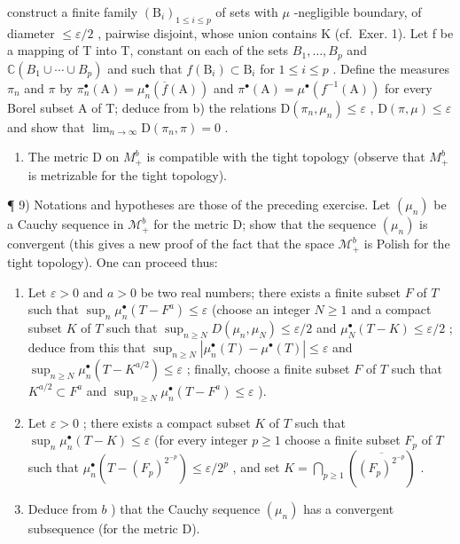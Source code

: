 construct a finite family \((\mathrm{B}_{i})_{1\leqslant i\leqslant p}\) of sets with \(\mu\) -negligible boundary, of diameter \(\leqslant\varepsilon/2\) , pairwise disjoint, whose union contains K (cf.~Exer. 1). Let f be a mapping of T into T, constant on each of the sets \(B_{1},\ldots,B_{p}\) and \(\mathbb{C}(B_{1}\cup\cdots\cup B_{p})\) and such that \(f(\mathrm{B}_i) \subset \mathrm{B}_i\) for \(1 \leqslant i \leqslant p\) . Define the measures \(\pi_n\) and \(\pi\) by \(\pi_n^\bullet(\mathrm{A}) = \mu_n^\bullet(\overline{f}(\mathrm{A}))\) and \(\pi^\bullet(\mathrm{A}) = \mu^\bullet(f^{-1}(\mathrm{A}))\) for every Borel subset A of T; deduce from b) the relations \(\mathrm{D}(\pi_n, \mu_n) \leqslant \varepsilon\) , \(\mathrm{D}(\pi, \mu) \leqslant \varepsilon\) and show that \(\lim_{n \to \infty} \mathrm{D}(\pi_n, \pi) = 0\) .

\begin{enumerate}
\def\labelenumi{\alph{enumi})}
\setcounter{enumi}{4}
\tightlist
\item
  The metric D on \(M_{+}^{b}\) is compatible with the tight topology (observe that \(M_{+}^{b}\) is metrizable for the tight topology).
\end{enumerate}

¶ 9) Notations and hypotheses are those of the preceding exercise. Let \((\mu_n)\) be a Cauchy sequence in \(\mathcal{M}_+^b\) for the metric D; show that the sequence \((\mu_n)\) is convergent (this gives a new proof of the fact that the space \(\mathcal{M}_+^b\) is Polish for the tight topology). One can proceed thus:

\begin{enumerate}
\def\labelenumi{\alph{enumi})}
\item
  Let \(\varepsilon > 0\) and \(a > 0\) be two real numbers; there exists a finite subset \(F\) of \(T\) such that \(\sup_{n} \mu_n^\bullet(T - F^a) \leqslant \varepsilon\) (choose an integer \(N \geqslant 1\) and a compact subset \(K\) of \(T\) such that \(\sup_{n \geqslant N} D(\mu_n, \mu_N) \leqslant \varepsilon/2\) and \(\mu_N^\bullet(T - K) \leqslant \varepsilon/2\) ; deduce from this that \(\sup_{n \geqslant N} |\mu_n^\bullet(T) - \mu^\bullet(T)| \leqslant \varepsilon\) and \(\sup_{n \geqslant N} \mu_n^\bullet(T - K^{a/2}) \leqslant \varepsilon\) ; finally, choose a finite subset \(F\) of \(T\) such that \(K^{a/2} \subset F^a\) and \(\sup_{n \geqslant N} \mu_n^\bullet(T - F^a) \leqslant \varepsilon\) ).
\item
  Let \(\varepsilon > 0\) ; there exists a compact subset \(K\) of \(T\) such that \(\sup_{n} \mu_n^\bullet(T - K) \leqslant \varepsilon\) (for every integer \(p \geqslant 1\) choose a finite subset \(F_p\) of \(T\) such that \(\mu_n^\bullet(T - (F_p)^{2^{-p}}) \leqslant \varepsilon / 2^p\) , and set \(K = \bigcap_{p\geqslant 1}(\overline{(F_p)^{2^{-p}}})\) .
\item
  Deduce from \(b\) ) that the Cauchy sequence \((\mu_n)\) has a convergent subsequence (for the metric D).
\end{enumerate}

